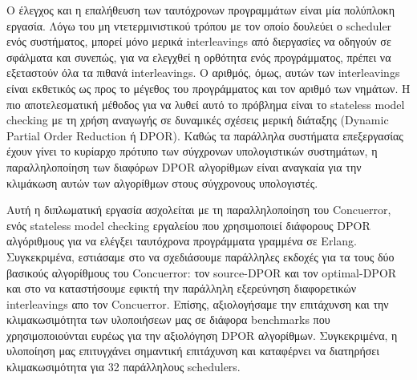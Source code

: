 Ο έλεγχος και η επαλήθευση των ταυτόχρονων προγραμμάτων είναι μία πολύπλοκη εργασία. Λόγω του μη ντετερμινιστικού τρόπου με τον οποίο δουλεύει ο scheduler ενός συστήματος, μπορεί μόνο μερικά interleavings από διεργασίες να οδηγούν σε σφάλματα και συνεπώς,  για να ελεγχθεί η ορθότητα ενός προγράμματος, πρέπει να εξεταστούν όλα τα πιθανά interleavings. Ο αριθμός, όμως, αυτών των  interleavings είναι εκθετικός ως προς το μέγεθος του προγράμματος και τον αριθμό των νημάτων. Η πιο αποτελεσματική μέθοδος για να λυθεί αυτό το πρόβλημα είναι το stateless model checking με τη χρήση αναγωγής σε δυναμικές σχέσεις μερική διάταξης (Dynamic Partial Order Reduction ή DPOR). Καθώς τα παράλληλα συστήματα επεξεργασίας έχουν γίνει το κυρίαρχο πρότυπο των σύγχρονων υπολογιστικών συστημάτων, η παραλληλοποίηση των διαφόρων DPOR αλγορίθμων είναι  αναγκαία για την κλιμάκωση αυτών των αλγορίθμων στους σύγχρονους υπολογιστές.

Αυτή η διπλωματική εργασία ασχολείται με τη παραλληλοποίηση του Concuerror, ενός stateless model checking εργαλείου που χρησιμοποιεί διάφορους DPOR αλγόριθμους για να ελέγξει ταυτόχρονα προγράμματα γραμμένα σε Erlang. Συγκεκριμένα, εστιάσαμε στο να σχεδιάσουμε  παράλληλες εκδοχές για τα τους δύο βασικούς αλγορίθμους του Concuerror: τον source-DPOR και τον optimal-DPOR και στο να καταστήσουμε εφικτή την παράλληλη εξερεύνηση διαφορετικών interleavings απο τον Concuerror.
Επίσης, αξιολογήσαμε την επιτάχυνση και την κλιμακωσιμότητα των υλοποιήσεων μας σε διάφορα benchmarks που χρησιμοποιούνται ευρέως για την αξιολόγηση DPOR αλγορίθμων. Συγκεκριμένα, η υλοποίηση μας επιτυγχάνει σημαντική επιτάχυνση και καταφέρνει να διατηρήσει κλιμακωσιμότητα για 32 παράλληλους schedulers.
